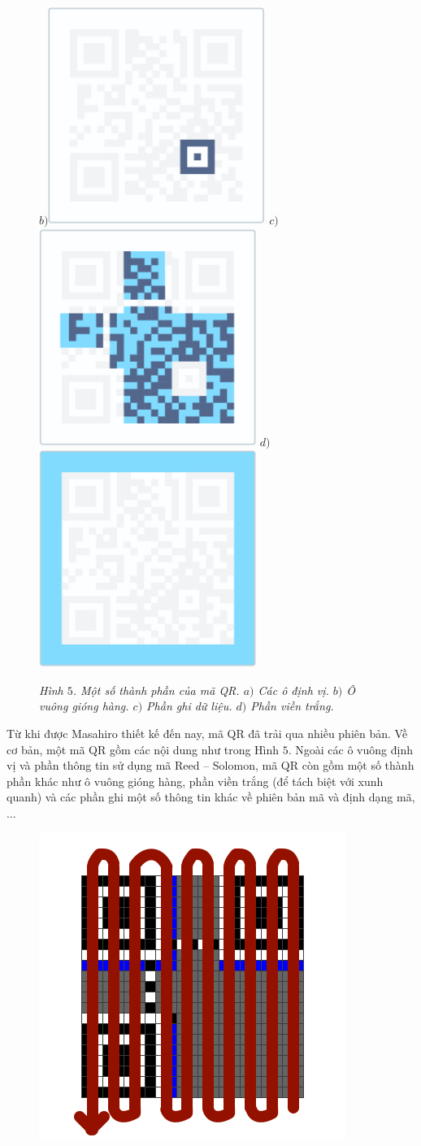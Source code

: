 \begin{multicols}{2}
\begin{figure}[H]
		$b)$\includegraphics[height=0.35\linewidth]{8}
		$c)$\includegraphics[height=0.35\linewidth]{9}
		$d)$\includegraphics[height=0.35\linewidth]{10}
		\caption{\small\textit{\color{toanhocdoisong}Hình $5$. Một số thành phần của mã QR. $a)$ Các ô định vị. $b)$ Ô vuông gióng hàng. $c)$ Phần ghi dữ liệu. $d)$ Phần viền trắng.}}
		\vspace*{-10pt}
	\end{figure}
	Từ khi được Masahiro thiết kế đến nay, mã QR đã trải qua nhiều phiên bản. Về cơ bản, một mã QR gồm các nội dung như trong Hình $5$. Ngoài các ô vuông định vị và phần thông tin sử dụng mã Reed -- Solomon, mã QR còn gồm một số thành phần khác như ô vuông gióng hàng, phần viền trắng (để tách biệt với xunh quanh) và các phần ghi một số thông tin khác về phiên bản mã và định dạng mã, ...
	\begin{figure}[H]
		\vspace*{-5pt}
		\centering
		\captionsetup{labelformat= empty, justification=centering}
		\includegraphics[height=0.35\linewidth]{11}
		

\end{figure}
\end{multicols}

